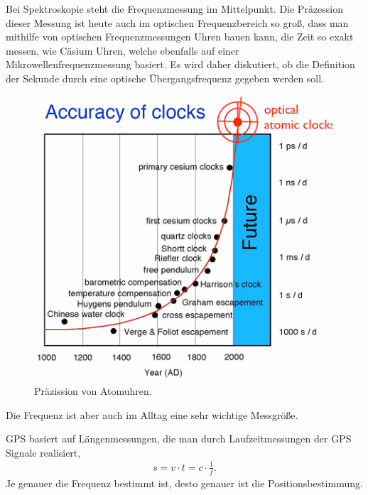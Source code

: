 
Bei Spektroskopie steht die Frequenzmessung im Mittelpunkt. Die Präzession
dieser Messung ist heute auch im optischen Frequenzbereich so groß, dass man
mithilfe von optischen Frequenzmessungen Uhren bauen kann, die Zeit so exakt
messen, wie Cäsium Uhren, welche ebenfalls auf einer Mikrowellenfrequenzmessung
basiert. Es wird daher diskutiert, ob die Definition der Sekunde durch eine
optische Übergangsfrequenz gegeben werden soll.

 \begin{figure}[!htbp]
	\centering
	\includegraphics[width=\textwidth]{fig/3-AccuracyOfClocks.png}
	\caption{Präzission von Atomuhren.}
\end{figure}

Die Frequenz ist aber auch im Alltag eine sehr wichtige Messgröße.
\begin{bspn}
GPS basiert auf Längenmessungen, die man durch Laufzeitmessungen der GPS
Signale realisiert,
\begin{align*}
s = v\cdot t = c\cdot\frac{1}{f}.
\end{align*}
Je genauer die Frequenz bestimmt ist, desto genauer ist die
Positionsbestimmung.\bsphere
\end{bspn}


